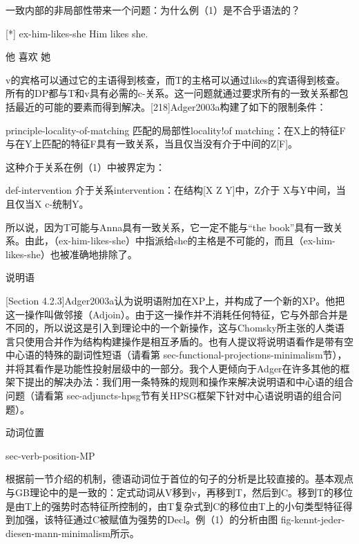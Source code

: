 一致内部的非局部性带来一个问题：为什么例（1）是不合乎语法的？


[*]
ex-him-likes-she
Him likes she.

他 喜欢 她



v的宾格可以通过它的主语得到核查，而T的主格可以通过likes的宾语得到核查。所有的DP都与T和v具有必需的c-关系。这一问题就通过要求所有的一致关系都包括最近的可能的要素而得到解决。[218]Adger2003a构建了如下的限制条件：





principle-locality-of-matching
匹配的局部性locality!of matching：在X上的特征F与在Y上匹配的特征F具有一致关系，当且仅当没有介于中间的Z[F]。



这种介于关系在例（1）中被界定为：


def-intervention
介于关系intervention：在结构[X  Z  Y]中，Z介于 X与Y中间，当且仅当X c-统制Y。




所以说，因为T可能与Anna具有一致关系，它一定不能与“the book”具有一致关系。由此，（ex-him-likes-she）中指派给she的主格是不可能的，而且（ex-him-likes-she）也被准确地排除了。





说明语


[Section 4.2.3]Adger2003a认为说明语附加在XP上，并构成了一个新的XP。他把这一操作叫做邻接（Adjoin）。由于这一操作并不消耗任何特征，它与外部合并是不同的，所以说这是引入到理论中的一个新操作，这与Chomsky所主张的人类语言只使用合并作为结构构建操作是相互矛盾的。也有人提议将说明语看作是带有空中心语的特殊的副词性短语（请看第 sec-functional-projections-minimalism节），并将其看作是功能性投射层级中的一部分。我个人更倾向于Adger在许多其他的框架下提出的解决办法：我们用一条特殊的规则和操作来解决说明语和中心语的组合问题（请看第 sec-adjuncts-hpsg节有关HPSG框架下针对中心语说明语的组合问题）。











动词位置

sec-verb-position-MP

根据前一节介绍的机制，德语动词位于首位的句子的分析是比较直接的。基本观点与GB理论中的是一致的：定式动词从V移到v，再移到T，然后到C。移到T的移位是由T上的强势时态特征所控制的，由T复杂式到C的移位由T上的小句类型特征得到加强，该特征通过C被赋值为强势的Decl。例（1）的分析由图 fig-kennt-jeder-diesen-mann-minimalism所示。






